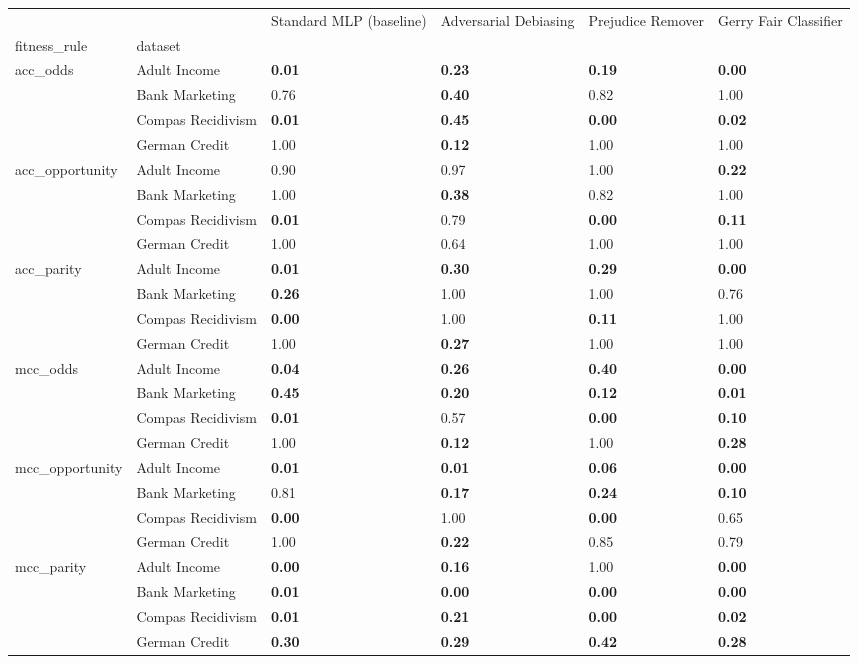 \begin{tabular}{llllll}
\toprule
 &  & Standard MLP (baseline) & Adversarial Debiasing & Prejudice Remover & Gerry Fair Classifier \\
fitness_rule & dataset &  &  &  &  \\
\midrule
\multirow[t]{4}{*}{acc_odds} & Adult Income & \textbf{0.01} & \textbf{0.23} & \textbf{0.19} & \textbf{0.00} \\
 & Bank Marketing & 0.76 & \textbf{0.40} & 0.82 & 1.00 \\
 & Compas Recidivism & \textbf{0.01} & \textbf{0.45} & \textbf{0.00} & \textbf{0.02} \\
 & German Credit & 1.00 & \textbf{0.12} & 1.00 & 1.00 \\
\cline{1-6}
\multirow[t]{4}{*}{acc_opportunity} & Adult Income & 0.90 & 0.97 & 1.00 & \textbf{0.22} \\
 & Bank Marketing & 1.00 & \textbf{0.38} & 0.82 & 1.00 \\
 & Compas Recidivism & \textbf{0.01} & 0.79 & \textbf{0.00} & \textbf{0.11} \\
 & German Credit & 1.00 & 0.64 & 1.00 & 1.00 \\
\cline{1-6}
\multirow[t]{4}{*}{acc_parity} & Adult Income & \textbf{0.01} & \textbf{0.30} & \textbf{0.29} & \textbf{0.00} \\
 & Bank Marketing & \textbf{0.26} & 1.00 & 1.00 & 0.76 \\
 & Compas Recidivism & \textbf{0.00} & 1.00 & \textbf{0.11} & 1.00 \\
 & German Credit & 1.00 & \textbf{0.27} & 1.00 & 1.00 \\
\cline{1-6}
\multirow[t]{4}{*}{mcc_odds} & Adult Income & \textbf{0.04} & \textbf{0.26} & \textbf{0.40} & \textbf{0.00} \\
 & Bank Marketing & \textbf{0.45} & \textbf{0.20} & \textbf{0.12} & \textbf{0.01} \\
 & Compas Recidivism & \textbf{0.01} & 0.57 & \textbf{0.00} & \textbf{0.10} \\
 & German Credit & 1.00 & \textbf{0.12} & 1.00 & \textbf{0.28} \\
\cline{1-6}
\multirow[t]{4}{*}{mcc_opportunity} & Adult Income & \textbf{0.01} & \textbf{0.01} & \textbf{0.06} & \textbf{0.00} \\
 & Bank Marketing & 0.81 & \textbf{0.17} & \textbf{0.24} & \textbf{0.10} \\
 & Compas Recidivism & \textbf{0.00} & 1.00 & \textbf{0.00} & 0.65 \\
 & German Credit & 1.00 & \textbf{0.22} & 0.85 & 0.79 \\
\cline{1-6}
\multirow[t]{4}{*}{mcc_parity} & Adult Income & \textbf{0.00} & \textbf{0.16} & 1.00 & \textbf{0.00} \\
 & Bank Marketing & \textbf{0.01} & \textbf{0.00} & \textbf{0.00} & \textbf{0.00} \\
 & Compas Recidivism & \textbf{0.01} & \textbf{0.21} & \textbf{0.00} & \textbf{0.02} \\
 & German Credit & \textbf{0.30} & \textbf{0.29} & \textbf{0.42} & \textbf{0.28} \\
\cline{1-6}
\bottomrule
\end{tabular}

